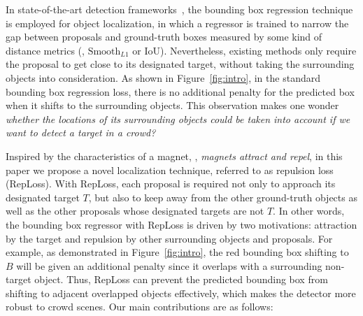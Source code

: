 \documentclass[10pt,twocolumn,letterpaper]{article}
\begin{document}
In state-of-the-art detection frameworks~\cite{Girshick_2015_ICCV,NIPS2015_5638,dai2016r,Lin_2017_CVPR}, the bounding box regression technique is employed for object localization, in which a regressor is trained to narrow the gap between proposals and ground-truth boxes measured by some kind of distance metrics (\eg, $\mathrm{Smooth}_{L1}$ or IoU). Nevertheless, existing methods only require the proposal to get close to its designated target, without taking the surrounding objects into consideration. As shown in Figure~\ref{fig:intro}, in the standard bounding box regression loss, there is no additional penalty for the predicted box when it shifts to the surrounding objects. This observation makes one wonder {\it whether the locations of its surrounding objects could be taken into account if we want to detect a target in a crowd?}

Inspired by the characteristics of a magnet, \ie, {\it magnets attract and repel}, in this paper we propose a novel localization technique, referred to as repulsion loss (RepLoss). With RepLoss, each proposal is required not only to approach its designated target $T$, but also to keep away from the other ground-truth objects as well as the other proposals whose designated targets are not $T$. In other words, the bounding box regressor with RepLoss is driven by two motivations: attraction by the target and repulsion by other surrounding objects and proposals. For example, as demonstrated in Figure~\ref{fig:intro}, the red bounding box shifting to $B$ will be given an additional penalty since it overlaps with a surrounding non-target object. Thus, RepLoss can prevent the predicted bounding box from shifting to adjacent overlapped objects effectively, which makes the detector more robust to crowd scenes. Our main contributions are as follows:
\end{document}
